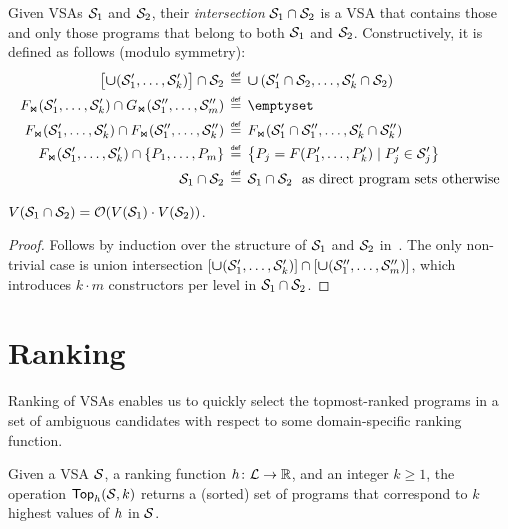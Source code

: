 \begin{defn}
    \label{def:intersection}
    Given VSAs $\mathcal{S}_1$ and $\mathcal{S}_2$, their \emph{intersection} $\mathcal{S}_1 \cap \mathcal{S}_2$ is a VSA that
    contains those and only those programs that belong to both $\mathcal{S}_1$ and $\mathcal{S}_2$.
    Constructively, it is defined as follows (modulo symmetry):
    \begingroup\allowdisplaybreaks
    \begin{align*}
        \bigl[\vsaunion(\vsa'_1, \dots, \vsa'_k)\bigr] \cap \vsa_2 &\bydef \vsaunion\,(\vsa'_1 \cap \vsa_2,
            \dots, \vsa'_k \cap \vsa_2) \\
        \joinCons(\vsa'_1, \dots, \vsa'_k) \cap \joinCons[G](\vsa''_1, \dots, \vsa''_m) &\bydef \emptyset \\
        \joinCons(\vsa'_1, \dots, \vsa'_k) \cap \joinCons(\vsa''_1, \dots, \vsa''_k) &\bydef
        \joinCons(\vsa'_1 \cap \vsa''_1, \dots, \vsa'_k \cap \vsa''_k) \\
        \joinCons(\vsa'_1, \dots, \vsa'_k) \cap \left\{P_1, \dots, P_m\right\} &\bydef
        \bigl\{P_j = F(P'_1, \dots, P'_k) \mid P'_j \in \vsa'_j\bigr\} \\
        \vsa_1 \cap \vsa_2 &\bydef \vsa_1 \cap \vsa_2\ \text{ as direct program sets otherwise}
    \end{align*}%
    \endgroup
\end{defn}

\begin{theorem}
    $V(\mathcal{S}_1 \cap \mathcal{S}_2) = \mathcal{O}(V(\mathcal{S}_1) \cdot V(\mathcal{S}_2))$.
\end{theorem}
\begin{proof}
    Follows by induction over the structure of $\mathcal{S}_1$ and $\mathcal{S}_2$ in~.
    The only non-trivial case is union intersection $[ \bm{\mathsf{\cup}}(\mathcal{S}'_1, \dots, \mathcal{S}'_k)] \cap [ \bm{\mathsf{\cup}}(\mathcal{S}''_1,
    \dots, \mathcal{S}''_m) ]$, which introduces $k \cdot m$ constructors per level in $\mathcal{S}_1 \cap \mathcal{S}_2$.
\end{proof}

\section{Ranking}
Ranking of VSAs enables us to quickly select the topmost-ranked programs in a set of ambiguous candidates with respect
to some domain-specific ranking function.

\begin{defn}
    Given a VSA $\mathcal{S}$, a ranking function $h\colon\mathcal{L}\to\mathbb{R}$, and an integer $k \ge 1$, the operation
    $\mathsf{Top}_{h}(\mathcal{S}, k)$ returns a (sorted) set of programs that correspond to $k$ highest values of $h$ in $\mathcal{S}$.
\end{defn}

